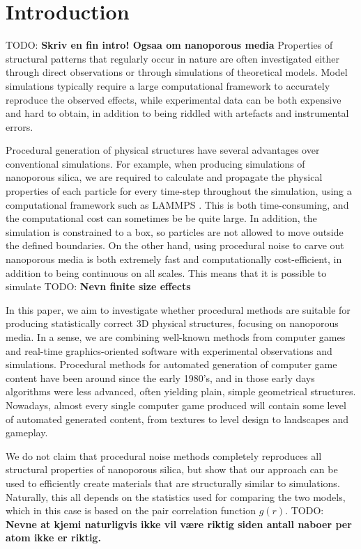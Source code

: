 \documentclass[aps,pre,twocolumn,letterpaper,floatfix,showpacs]{revtex4}
\newcommand{\todo}[1]{ {\color{Magenta} TODO: \color{Blue} \textbf{#1} }}
\begin{document}
\section{Introduction}

\todo{Skriv en fin intro! Ogsaa om nanoporous media}
Properties of structural patterns that regularly occur in nature are often investigated either through direct observations or through simulations of theoretical models. Model simulations typically require a large computational framework to accurately reproduce the observed effects, while experimental data can be both expensive and hard to obtain, in addition to being riddled with artefacts and instrumental errors.   

Procedural generation of physical structures have several advantages over conventional simulations. For example, when producing simulations of nanoporous silica, we are required to calculate and propagate the physical properties of each particle for every time-step throughout the simulation, using a computational framework such as LAMMPS \cite{plimpton1995fast}. This is both time-consuming, and the computational cost can sometimes be be quite large. In addition, the simulation is constrained to a box, so particles are not allowed to move outside the defined boundaries. On the other hand, using procedural noise to carve out nanoporous media is both extremely fast and computationally cost-efficient, in addition to being continuous on all scales. This means that it is possible to simulate 
\todo{Nevn finite size effects}

In this paper, we aim to investigate whether procedural methods are suitable for producing statistically correct 3D physical structures, focusing on nanoporous media. In a sense, we are combining well-known methods from computer games and real-time graphics-oriented software with experimental observations and simulations. Procedural methods for automated generation of computer game content have been around since the early 1980's, and in those early days algorithms were less advanced, often yielding plain, simple geometrical structures. Nowadays, almost every single computer game produced will contain some level of automated generated content, from textures to level design to landscapes and gameplay. 

We do not claim that procedural noise methods completely reproduces all structural properties of nanoporous silica, but show that our approach can be used to efficiently create materials that are structurally similar to simulations. Naturally, this all depends on the statistics used for comparing the two models, which in this case is based on the pair correlation function $g(r)$. 
\todo{Nevne at kjemi naturligvis ikke vil være riktig siden antall naboer per atom ikke er riktig. }
\end{document}
